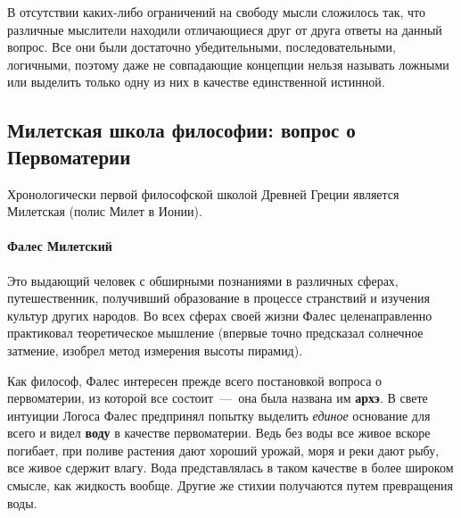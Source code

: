 В отсутствии каких-либо ограничений на
свободу мысли сложилось так, что различные мыслители находили отличающиеся друг
от друга ответы на данный вопрос. Все они были достаточно убедительными,
последовательными, логичными, поэтому даже не совпадающие концепции нельзя
называть ложными или выделить только одну из них в качестве единственной
истинной.

\subsection{Милетская школа философии: вопрос о Первоматерии}

Хронологически первой философской школой Древней Греции является Милетская (полис Милет в Ионии). 

\paragraph{Фалес Милетский}

Это выдающий человек с обширными познаниями в различных сферах, путешественник, получивший образование в процессе странствий и изучения культур других народов. 
Во всех сферах своей жизни Фалес целенаправленно практиковал теоретическое мышление (впервые точно предсказал солнечное затмение, изобрел метод измерения высоты пирамид). 

Как философ, Фалес интересен прежде всего постановкой вопроса о первоматерии, из которой все состоит~---~она была названа им \textbf{архэ}. 
В свете интуиции Логоса Фалес предпринял попытку выделить \textit{единое} основание для всего и видел \textbf{воду} в качестве первоматерии. 
Ведь без воды все живое вскоре погибает, при поливе растения дают хороший урожай, моря и реки дают рыбу, все живое сдержит влагу.  Вода представлялась в таком качестве в более широком смысле, как жидкость вообще.  Другие же стихии получаются путем превращения воды.

